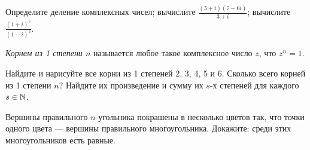 \documentclass[a4paper, 12pt]{article}
\begin{document}
 Определите деление комплексных чисел;
 вычислите $\frac{(5+i)(7-6i)}{3+i}$;
 вычислите~$\frac{(1+i)^5}{(1-i)^3}$.



{\em Корнем из 1 степени $n$} называется любое такое комплексное число $z$, что $z^n=1$.

 Найдите и нарисуйте все корни из 1 степеней 2, 3, 4, 5 и 6.
 Сколько всего корней из 1 степени $n$? Найдите их произведение и сумму их $s$-х степеней для каждого $s\in\mathbb{N}$.



Вершины правильного $n$-угольника покрашены в несколько цветов так, что точки одного цвета --- вершины правильного многоугольника. Докажите: среди этих многоугольников есть равные.







\end{document}
